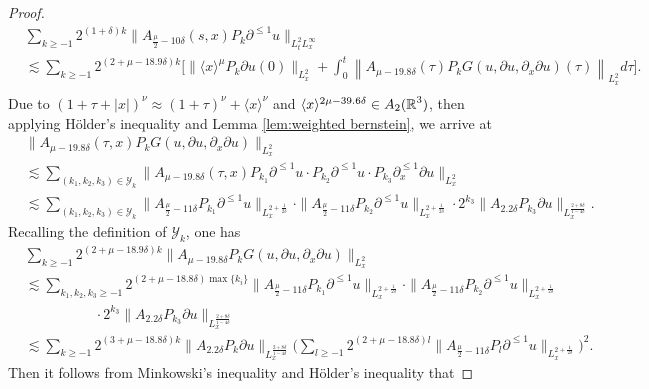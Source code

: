 \documentclass[11pt,twoside]{article}
\def\cY{\mathcal Y}
\def\R{\mathop{\mathbb R\kern 0pt}\nolimits}
\def\f{\frac}
\def\p{\partial}
\def\ls{\lesssim}
\newcommand{\w}[1]{\langle {#1} \rangle}
\theoremstyle{plain}
\theoremstyle{definition}
\numberwithin{equation}{section}
\begin{document}
\begin{proof}
\begin{equation}
\begin{split}
		&\sum_{k\ge -1}2^{(1+\delta) k}\|A_{\f{\mu}{2}-10\delta}(s,x)P_k\p^{\le 1} u\|_{L^{2}_tL^\infty_x}\\
		&\ls
	\sum_{k\ge -1}2^{(2+\mu -18.9\delta) k}
	\big[\|\w{x}^{\mu}P_k\partial u(0)\|_{L^2_x}
	+\int_{0}^{t}\left\|A_{\mu-19.8\delta}(\tau)
	 P_k  G(u,\p u,\p_x\p u)(\tau)\right\|_{L^{2}_x}d\tau\big].\\
	\end{split}
	\end{equation}
	Due to $(1+\tau+|x|)^{\nu}\approx(1+\tau)^{\nu}+\w{x}^{\nu}$ and $\w{x}^{2\mu-39.6\delta}\in A_2(\R^3)$,
then applying H\"older's inequality and Lemma \ref{lem:weighted bernstein}, we arrive at
	\begin{equation}\label{3.25}
	\begin{split}
		&\|A_{\mu-19.8\delta}(\tau,x)P_k G(u,\p u,\p_x\p u)\|_{L^2_x}\\
		&\ls
		\sum_{(k_1,k_2,k_3)\in \cY_k}\|A_{\mu-19.8\delta}(\tau,x)P_{k_1}\p^{\le 1} u\cdot P_{k_2}\p^{\le 1} u\cdot P_{k_3}\p_x^{\le 1}\p u\|_{L^2_x}\\
		&\ls
		\sum_{(k_1,k_2,k_3)\in \cY_k}
		\|A_{\f{\mu}{2}-11\delta}P_{k_1}\p^{\le 1} u\|_{L^{2+\f{1}{2\delta}}_x }
		\cdot\|A_{\f{\mu}{2}-11\delta}P_{k_2}\p^{\le 1} u\|_{L^{2+\f{1}{2\delta}}_x}
		\cdot 2^{k_3}\|A_{2.2\delta} P_{k_3}\p u\|_{L^{\f{2+8\delta}{1-4\delta}}_x}.
	\end{split}	
	\end{equation}
 Recalling the definition of $\cY_k$, one has
\begin{equation}\label{3.27}
\begin{split}
&\sum_{k\ge -1}2^{(2 +\mu -18.9\delta) k}\|A_{\mu-19.8\delta}
P_k G(u,\p u,\p_x\p u)\|_{L^2_x}\\
&\ls
\sum_{k_1,k_2,k_3\ge -1} 2^{(2 +\mu -18.8\delta) \max\{k_i\}}
\|A_{\f{\mu}{2}-11\delta}P_{k_1}\p^{\le 1} u\|_{L^{2+\f{1}{2\delta}}_x}
\cdot\|A_{\f{\mu}{2}-11\delta}P_{k_2}\p^{\le 1} u\|_{L^{2+\f{1}{2\delta}}_x}  \\
&\qquad\qquad\quad\cdot 2^{k_3}\|A_{2.2\delta} P_{k_3}\p u\|_{L^{\f{2+8\delta}{1-4\delta}}_x}\\
&\ls
\sum_{k\ge -1}2^{(3 +\mu-18.8\delta) k}\|A_{2.2\delta} P_{k}\p u\|_{L^{\f{2+8\delta}{1-4\delta}}_x}
\big(\sum_{l\ge-1}2^{(2 +\mu -18.8\delta) l} \|A_{\f{\mu}{2}-11\delta}P_{l}\p^{\le 1} u\|_{L^{2+\f{1}{2\delta}}_x}\big)^2.
\end{split}
\end{equation}
Then it follows from  Minkowski's inequality and H\"older's inequality that

\end{proof}
\end{document}
